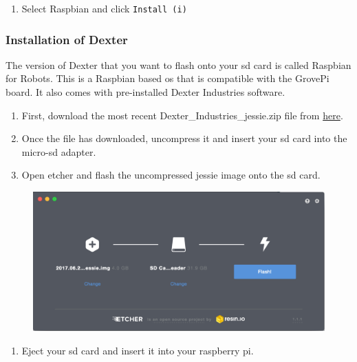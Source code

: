 \begin{enumerate}
\def\labelenumi{\arabic{enumi}.}
\setcounter{enumi}{5}
\tightlist
\item
  Select Raspbian and click \texttt{Install\ (i)}
\end{enumerate}

\subsubsection{Installation of Dexter}\label{installation-of-dexter}

The version of Dexter that you want to flash onto your sd card is called
Raspbian for Robots. This is a Raspbian based os that is compatible with
the GrovePi board. It also comes with pre-installed Dexter Industries
software.

\begin{enumerate}
\def\labelenumi{\arabic{enumi}.}
\tightlist
\item
  First, download the most recent Dexter\_Industries\_jessie.zip file
  from
  \href{https://sourceforge.net/projects/dexterindustriesraspbianflavor/}{here}.
\item
  Once the file has downloaded, uncompress it and insert your sd card
  into the micro-sd adapter.
\item
  Open etcher and flash the uncompressed jessie image onto the sd card.
\end{enumerate}

\begin{figure}
\centering
\includegraphics{images/etcher.png}
\caption{}
\end{figure}

\begin{enumerate}
\def\labelenumi{\arabic{enumi}.}
\setcounter{enumi}{3}
\tightlist
\item
  Eject your sd card and insert it into your raspberry pi.
\end{enumerate}

